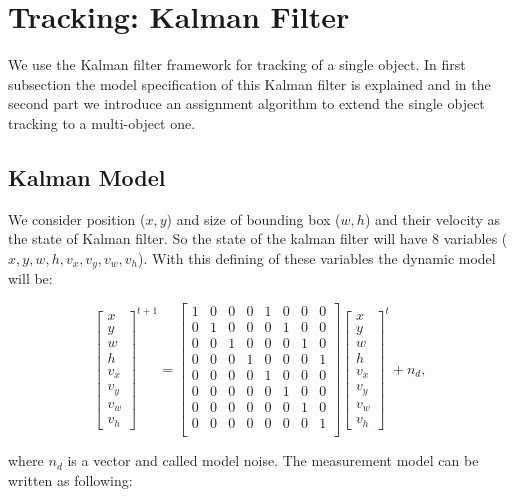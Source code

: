 \documentclass[conference]{IEEEtran}
\begin{document}
\section{Tracking: Kalman Filter}
We use the Kalman filter framework for tracking of a single object. In first subsection the model specification of this Kalman filter is explained and in the second part we introduce  an assignment algorithm  to extend the single object tracking to a multi-object one.
\subsection{Kalman Model}
We consider position ($x,y$) and size of bounding box ($w,h$) and their velocity as the state of Kalman filter. So the state of the kalman filter will have 8 variables ($x,y,w,h,v_x,v_y,v_w,v_h$).
With this defining of these variables the dynamic model will be:

\[
\begin{bmatrix}
x \\
y \\
w \\
h \\
v_x \\
v_y \\
v_w \\
v_h
\end{bmatrix}^{t+1}
=
\begin{bmatrix}
1 &0 & 0 & 0  & 1 & 0 &0 &0 \\
0 &1 & 0 & 0  & 0 & 1 &0 &0 \\
0 &0 & 1 & 0  & 0 & 0 &1 &0 \\
0 &0 & 0 & 1  & 0 & 0 &0 &1 \\
0 &0 & 0 & 0  & 1 & 0 &0 &0 \\
0 &0 & 0 & 0  & 0 & 1 &0 &0 \\
0 &0 & 0 & 0  & 0 & 0 &1 &0 \\
0 &0 & 0 & 0  & 0 & 0 &0 &1 \\
\end{bmatrix}
\begin{bmatrix}
x \\
y \\
w \\
h \\
v_x \\
v_y \\
v_w \\
v_h
\end{bmatrix}^t+n_d,
\]

where $n_d$ is a vector and called model noise. The measurement model can be written as following:
\end{document}
